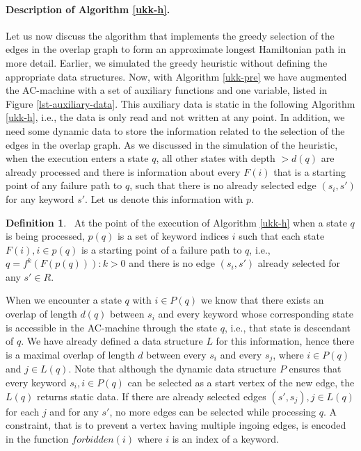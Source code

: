 \documentclass[english,twoside,censored,csm,algorithms-track-2020]{HYthesisML}
\theoremstyle{plain}
\theoremstyle{definition}
\newtheorem{definition}[theorem]{Definition}
\begin{document}
\paragraph{Description of Algorithm \ref{ukk-h}.}
Let us now discuss the algorithm that implements the greedy selection of the edges in the
overlap graph to form an approximate longest Hamiltonian path in more detail. Earlier, we simulated
the greedy heuristic without defining the appropriate data structures. Now, with Algorithm
\ref{ukk-pre} we have augmented the AC-machine with a set of auxiliary functions and one variable,
listed in Figure \ref{lst-auxiliary-data}.
This auxiliary data is static in the following Algorithm \ref{ukk-h}, i.e., the data is only read
and not written at any point. In addition, we need some dynamic data to store the information
related to the selection of the edges in the overlap graph. As we discussed in the simulation
of the heuristic, when the execution enters a state $q$, all other states with depth $>d(q)$ are
already processed and there is information about every $F(i)$ that is a starting point of any failure
path to $q$,
such that there is no already selected edge $(s_i, s')$ for any keyword $s'$. Let us denote
this information with $p$.

\begin{definition}~\label{def-p}
  At the point of the execution of Algorithm \ref{ukk-h} when a state $q$ is being processed,
  $p(q)$ is a set of keyword indices $i$ such that each state $ F(i), i\in p(q)$ is
  a starting point of a failure path to $q$, i.e., $q = f^k(F(p(q))) : k>0$ and there is no
  edge $(s_i, s')$ already selected for any $s'\in R$.
\end{definition}

When we encounter a state $q$ with $i\in P(q)$ we know that there exists an overlap of length
$d(q)$ between $s_i$ and every keyword whose corresponding state is accessible in the AC-machine
through the state $q$, i.e., that state is descendant of $q$. We have already defined a data structure
$L$ for this information, hence there is a maximal overlap of length $d$ between every $s_i$
and every $s_j$, where $i\in P(q)$ and $j\in L(q)$.
Note that although the dynamic data structure $P$ ensures that every keyword $s_i, i\in P(q)$ can be selected
as a start vertex of the new edge, the $L(q)$ returns static data. If there are already selected
edges $(s',s_j), j\in L(q)$ for each $j$ and for any $s'$, no more edges can be selected while processing $q$.
A constraint, that is to prevent a vertex having multiple ingoing edges, is encoded in the
function $forbidden(i)$ where $i$ is an index of a keyword.
\end{document}
